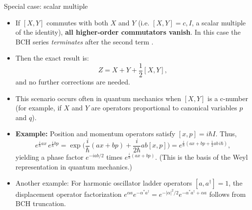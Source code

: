 \documentclass{beamer}
\begin{document}
\begin{frame}{Special case: scalar multiple}
\begin{itemize}
\item If $[X, Y]$ commutes with both $X$ and $Y$ (i.e. $[X,Y] = c,I$, a scalar multiple of the identity), \textbf{all higher-order commutators vanish}. In this case the BCH series \emph{terminates} after the second term .
\item Then the exact result is:
\[  
Z = X + Y + \frac{1}{2}[X,Y],
\]
and no further corrections are needed.
\item This scenario occurs often in quantum mechanics when $[X,Y]$ is a c-number (for example, if $X$ and $Y$ are operators proportional to canonical variables $p$ and $q$).
\item \textbf{Example:} Position and momentum operators satisfy $[x, p] = i\hbar I$. Thus,
\[  
e^{\frac{i}{\hbar} a x}\,e^{\frac{i}{\hbar} b p} = \exp\!\Big(\frac{i}{\hbar}(a x + b p) + \frac{i}{2\hbar} a b [x,p]\Big) = e^{\frac{i}{\hbar}(a x + b p + \frac{1}{2}ab\,i\hbar)},
\]
yielding a phase factor $e^{-i ab/2}$ times $e^{\frac{i}{\hbar}(a x + b p)}$.  (This is the basis of the Weyl representation in quantum mechanics.)
\item Another example: For harmonic oscillator ladder operators $[a, a^\dagger]=1$, the displacement operator factorization $e^{\alpha a} e^{-\alpha^* a^\dagger} = e^{-|\alpha|^2/2} e^{-\alpha^* a^\dagger + \alpha a}$ follows from BCH truncation.
\end{itemize}
\end{frame}
\end{document}
